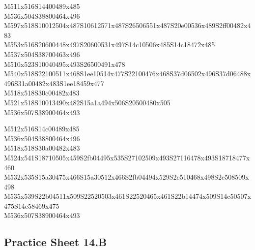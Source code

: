 \documentclass{article}
\begin{document}
\begin{multicols}{5}
\begin{center}
M511x516S14400489x485 %
\\M536x504S38800464x496 %
\\M597x518S10012504x487S10612571x487S26506551x487S20e00536x489S2ff00482x483 %
\\M553x516S20600448x497S20600531x497S14c10506x485S14c18472x485 %
\\M537x504S38700463x496 %
\\M510x523S10040495x493S26500491x478 %
\\M540x518S22100511x468S1ee10514x477S22100476x468S37d06502x496S37d06488x496S31a00482x483S1ee18459x477 %
\\M518x518S30c00482x483 %
\\M521x518S10013490x482S15a1a494x506S20500480x505 %
\\M536x507S38900464x493 %
\vfil
\columnbreak

M512x516S14c00489x485 %
\\M536x504S38800464x496 %
\\M518x518S30a00482x483 %
\\M524x541S18710505x459S2fb04495x535S27102509x493S27116478x493S18718477x460 %
\\M532x535S15a30475x466S15a30512x466S2fb04494x529S2e510468x498S2e508509x498 %
\\M535x539S22b04511x509S22520503x461S22520465x461S22b14474x509S14c50507x475S14c58469x475 %
\\M536x507S38900464x493 %
\vfil

\end{center}
\end{multicols}

\subsection{Practice Sheet 14.B}
\end{document}
